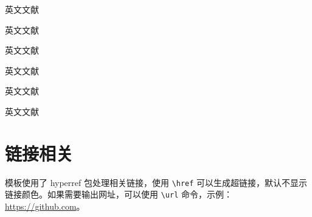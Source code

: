 英文文献 \parencite[Thm1]{feynman2011}

英文文献 \parencite[12][Thm1]{feynman2011}

英文文献 \cite{feynman2011}

英文文献 \cite[12]{feynman2011}

英文文献 \cite[Thm1]{feynman2011}

英文文献 \cite[12][Thm1]{feynman2011}

\section{链接相关}


模板使用了 hyperref 包处理相关链接，使用 \verb|\href| 可以生成超链接，默认不显示链接颜色。如果需要输出网址，可以使用 \verb|\url| 命令，示例：\url{https://github.com}。